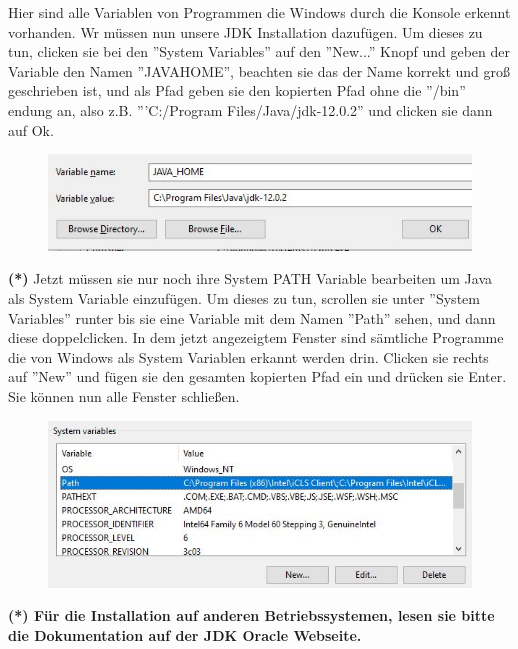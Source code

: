 \documentclass[fontsize=12pt,paper=a4,twoside]{scrartcl}
\begin{document}
Hier sind alle Variablen von Programmen die Windows durch die Konsole erkennt vorhanden. Wr müssen nun unsere JDK Installation dazufügen. Um dieses zu tun, clicken sie bei den ''System Variables'' auf den ''New...'' Knopf und geben der Variable den Namen ''JAVA\textunderscore HOME'', beachten sie das der Name korrekt und groß geschrieben ist, und als Pfad geben sie den kopierten Pfad ohne die ''/bin'' endung an, also z.B. '''C:/Program Files/Java/jdk-12.0.2'' und clicken sie dann auf Ok.
\begin{figure}[H]
\centering
\includegraphics[width=\linewidth]{JAVA_HOME.JPG}
\end{figure} 

\textbf{(*)}
Jetzt müssen sie nur noch ihre System PATH Variable bearbeiten um Java als System Variable einzufügen. Um dieses zu tun, scrollen sie unter ''System Variables'' runter bis sie eine Variable mit dem Namen ''Path'' sehen, und dann diese doppelclicken. In dem jetzt angezeigtem Fenster sind sämtliche Programme die von Windows als System Variablen erkannt werden drin. Clicken sie rechts auf ''New'' und fügen sie den gesamten kopierten Pfad ein und drücken sie Enter. Sie können nun alle Fenster schließen. 
\begin{figure}[H]
\centering
\includegraphics[width=\linewidth]{SystemVariables.JPG}
\end{figure} 

\textbf{(*) Für die Installation auf anderen Betriebssystemen, lesen sie bitte die Dokumentation auf der JDK Oracle Webseite.}


\end{document}
